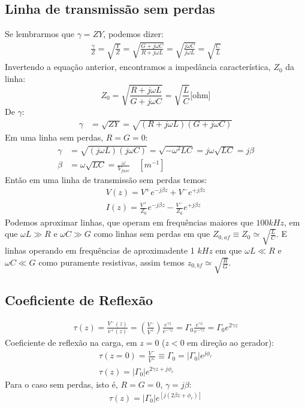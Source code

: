 \documentclass[11pt,a4paper]{article}
\begin{document}
\subsection{Linha de transmissão sem perdas}
Se lembrarmos que $\gamma = ZY$, podemos dizer:
\begin{align*}
\frac{ \gamma }{Z} = \sqrt{ \frac{Y}{Z}} =\sqrt{\frac{G+ j \omega C}{R+ j \omega L}}= \sqrt{\frac{j \omega C}{j \omega L}}= \sqrt{\frac{C}{L}}
\end{align*}
Invertendo a equação anterior, encontramos a impedância característica, $Z_0$ da linha:
\begin{equation*}
  Z_0= \sqrt{ \frac{R+j \omega L}{G+ j \omega C} } =\sqrt{ \frac{L}{C} } \text{[ohm]}
\end{equation*}
De $\gamma$:
\begin{align*}
  \gamma & = \sqrt{ZY} = \sqrt{(R + j \omega L)(G + j \omega C)} 
\end{align*}
Em uma linha sem perdas, $R=G=0$:
\begin{align*}
  \gamma &= \sqrt{(j \omega L)(j \omega C)}=\sqrt{-\omega^2 LC}=j\omega \sqrt{LC} = j \beta \\
  \beta &= \omega \sqrt{LC} = \frac{\omega}{V_{fase}} \quad [m^{-1}]
\end{align*}
Então em uma linha de transmissão sem perdas temos:
\begin{align*}
V(z)= V^+ e^{-j \beta z} + V^- e^{+j \beta z} \\
I(z)= \frac{V^+}{Z_0} e^{-j \beta z} - \frac{V^-}{Z_0} e^{+j \beta z}
\end{align*}
Podemos aproximar linhas, que operam em frequências maiores que $100kHz$,  em que $\omega L \gg R$ e  $\omega C \gg G$  como linhas sem perdas em que $Z_{0,af} \equiv Z_0 \simeq \sqrt{\frac{L}{C}}$. E linhas operando em frequências de aproximadente 1 $kHz$ em que $\omega L \ll R$ e $ \omega C \ll G$ como puramente resistivas, assim temos $z_{0,bf} \simeq \sqrt{\frac{R}{G}}$.

\subsection{Coeficiente de Reflexão}
\begin{align*}
  \tau (z) = \frac{V^-(z)}{v^+ (z)} = (\frac{V^-}{V^+})\frac{e^{\gamma z}}{e^{-\gamma z}} = \Gamma_0 \frac{e^{\gamma z}}{e^{-\gamma z}}= \Gamma_0 e^{2 \gamma z}
\end{align*}
Coeficiente de reflexão na carga, em $z=0$ ($z<0$ em direção ao gerador):
\begin{align*}
  \tau(z=0)= \frac{V^-}{V^+}\equiv \Gamma_0 = |\Gamma_0| e^{j \phi_r}\\
  \tau (z) = | \Gamma_0 | e^{2 \gamma z + j \phi_r}
\end{align*}
Para o caso sem perdas, isto é, $R=G=0$, $\gamma = j \beta$:
\begin{align*}
  \tau(z) = | \Gamma_0| e^{\left[j(2\beta z + \phi_r) \right]}
\end{align*}
\end{document}
